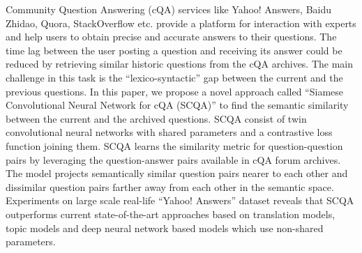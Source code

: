 Community Question Answering (cQA) services like Yahoo! Answers, Baidu Zhidao, Quora, StackOverflow etc. provide a platform for interaction with experts and help users to obtain precise and accurate answers to their questions. The time lag between the user posting a question and receiving its answer could be reduced by retrieving similar historic questions from the cQA archives. The main challenge in this task is the ``lexico-syntactic'' gap between the current and the previous questions. In this paper, we propose a novel approach called ``Siamese Convolutional Neural Network for cQA (SCQA)'' to find the semantic similarity between the current and the archived questions. SCQA consist of twin convolutional neural networks with shared parameters and a contrastive loss function joining them. SCQA learns the similarity metric for question-question pairs by leveraging the question-answer pairs available in cQA forum archives. The model projects semantically similar question pairs nearer to each other and dissimilar question pairs farther away from each other in the semantic space. Experiments on large scale real-life ``Yahoo! Answers'' dataset reveals that SCQA outperforms current state-of-the-art approaches based on translation models, topic models and deep neural network based models which use non-shared parameters.
